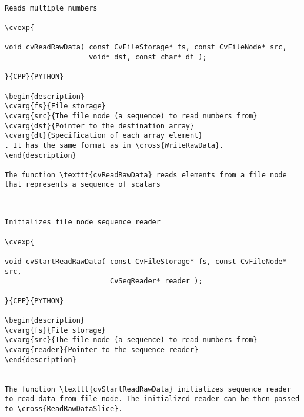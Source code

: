 \begin{verbatim}

Reads multiple numbers

\cvexp{

void cvReadRawData( const CvFileStorage* fs, const CvFileNode* src,
                    void* dst, const char* dt );

}{CPP}{PYTHON}

\begin{description}
\cvarg{fs}{File storage}
\cvarg{src}{The file node (a sequence) to read numbers from}
\cvarg{dst}{Pointer to the destination array}
\cvarg{dt}{Specification of each array element}
. It has the same format as in \cross{WriteRawData}.
\end{description}

The function \texttt{cvReadRawData} reads elements from a file node that represents a sequence of scalars


\end{verbatim}
\label{StartReadRawData}
\begin{verbatim}

Initializes file node sequence reader

\cvexp{

void cvStartReadRawData( const CvFileStorage* fs, const CvFileNode* src,
                         CvSeqReader* reader );

}{CPP}{PYTHON}

\begin{description}
\cvarg{fs}{File storage}
\cvarg{src}{The file node (a sequence) to read numbers from}
\cvarg{reader}{Pointer to the sequence reader}
\end{description}


The function \texttt{cvStartReadRawData} initializes sequence reader to read data from file node. The initialized reader can be then passed to \cross{ReadRawDataSlice}.


\end{verbatim}
\label{ReadRawDataSlice}
